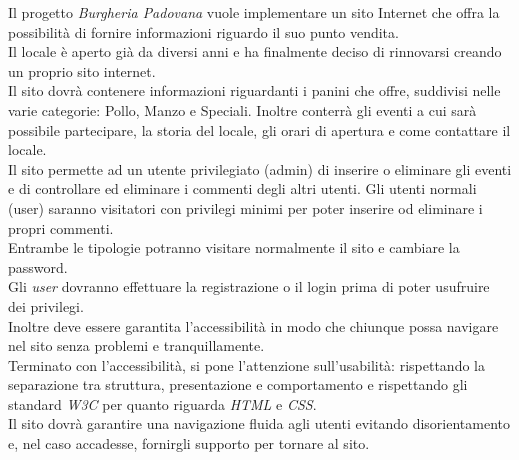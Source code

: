 Il progetto \emph{Burgheria Padovana} vuole implementare un sito Internet che offra la possibilità di fornire informazioni riguardo il suo punto vendita.\\
Il locale è aperto già da diversi anni e ha finalmente deciso di rinnovarsi creando un proprio sito internet.\\
Il sito dovrà contenere informazioni riguardanti i panini che offre, suddivisi nelle varie categorie: Pollo, Manzo e Speciali. 
Inoltre conterrà gli eventi a cui sarà possibile partecipare, la storia del locale, gli orari di apertura e come contattare il locale.\\
Il sito permette ad un utente privilegiato (admin) di inserire o eliminare gli eventi e di controllare ed eliminare i commenti degli altri utenti. Gli utenti normali (user) saranno visitatori 
con privilegi minimi per poter inserire od eliminare i propri commenti.\\
Entrambe le tipologie potranno visitare normalmente il sito e cambiare la password.\\
Gli \emph{user} dovranno effettuare la registrazione o il login prima di poter usufruire dei privilegi.\\
Inoltre deve essere garantita l'accessibilità in modo che chiunque possa navigare nel sito senza problemi e tranquillamente.\\
Terminato con l'accessibilità, si pone l'attenzione sull'usabilità: rispettando la separazione tra struttura, presentazione e comportamento e rispettando gli standard \emph{W3C} per quanto riguarda \emph{HTML} e \emph{CSS}.\\
Il sito dovrà garantire una navigazione fluida agli utenti evitando disorientamento e, nel caso accadesse, fornirgli supporto per tornare al sito.\\